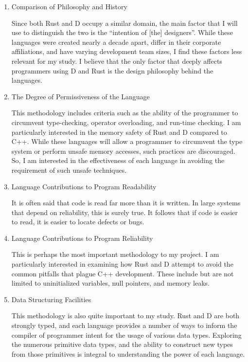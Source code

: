 \documentclass[finalcopy]{srpaper}
\begin{document}
\begin{enumerate}
\item Comparison of Philosophy and History

Since both Rust and D occupy a similar domain, the main factor that I will use
to distinguish the two is the ``intention of [the] designers''. While these
languages were created nearly a decade apart, differ in their corporate
affiliations, and have varying development team sizes, I find these factors less
relevant for my study. I believe that the only factor that deeply affects
programmers using D and Rust is the design philosophy behind the languages.

\item The Degree of Permissiveness of the Language

This methodology includes criteria such as the ability of the programmer to
circumvent type-checking, operator overloading, and run-time checking. I am
particularly interested in the memory safety of Rust and D compared to C++.
While these languages will allow a programmer to circumvent the type system or
perform unsafe memory accesses, such practices are discouraged. So, I am
interested in the effectiveness of each language in avoiding the requirement of
such unsafe techniques.

\item Language Contributions to Program Readability

It is often said that code is read far more than it is written. In large
systems that depend on reliability, this is surely true. It follows that if
code is easier to read, it is easier to locate defects or bugs.

\item Language Contributions to Program Reliability

This is perhaps the most important methodology to my project. I am particularly
interested in examining how Rust and D attempt to avoid the common pitfalls
that plague C++ development. These include but are not limited to uninitialized
variables, null pointers, and memory leaks.

\item Data Structuring Facilities

This methodology is also quite important to my study. Rust and D are both
strongly typed, and each language provides a number of ways to inform the
compiler of programmer intent for the usage of various data types. Exploring
the numerous primitive data types, and the ability to construct new types from
those primitives is integral to understanding the power of each language.


\end{enumerate}
\end{document}
